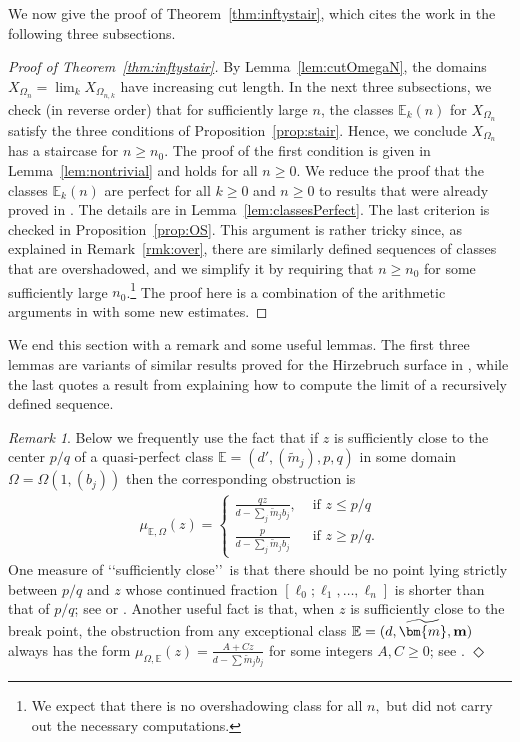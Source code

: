 \documentclass[11pt, reqno]{amsart}
\theoremstyle{remark}
\numberwithin{equation}{subsection}
\numberwithin{figure}{section}
\theoremstyle{customremark}
\newtheorem{rmk_no_diamond}[thm]{Remark}
\newenvironment{rmk}{\begin{rmk_no_diamond} } {\hfill$\er$ \end{rmk_no_diamond}}
\newcommand{\Tm}{{\widetilde m}}
\newcommand{\bE}{{\mathbb E}}
\newcommand{\Om}{{\Omega}}
\newcommand{\er}{{\Diamond}}
\newcommand{\btm}{\widetilde{\bm{m}}}
\begin{document}
We now give the proof of Theorem~\ref{thm:inftystair}, which cites the work in the following three subsections. 
\begin{proof}[Proof of Theorem~\ref{thm:inftystair}]
	By Lemma~\ref{lem:cutOmegaN}, the domains $X_{\Omega_n} = \lim_k X_{\Omega_{n,k}}$ have increasing cut length. In the next three subsections, we check (in reverse order) that for sufficiently large $n$, the classes $\bE_k(n)$ for $X_{\Omega_n}$ satisfy the three conditions of Proposition~\ref{prop:stair}. Hence, we conclude $X_{\Omega_n}$ has a staircase for $n \geq n_0$. The proof of the first condition is given in Lemma~\ref{lem:nontrivial} and holds for all $n \geq 0$. 
	We reduce the proof that the classes $\bE_k(n)$ are perfect for all $k \geq 0$ and $n \geq 0$  to results that were already proved in \cite{BHM}. The details are in  Lemma~\ref{lem:classesPerfect}.  The last criterion is checked in Proposition~\ref{prop:OS}. This argument is rather tricky since, as explained in Remark~\ref{rmk:over}, there are similarly defined sequences of classes that are overshadowed, and we simplify it by requiring
	 that $n \geq n_0$ for some sufficiently large $n_0$.\footnote{We expect that there is no overshadowing class for all $n,$ but did not carry out the necessary computations.} 
	 The proof here is a combination of the arithmetic arguments in \cite[\S4.3]{MM} with some new estimates.
\end{proof} 

We end this section with a remark and some useful lemmas. The first three lemmas are variants of similar results proved for the Hirzebruch surface in \cite{BHM}, while the last quotes a result from \cite{MM} explaining how to compute the limit of a recursively defined sequence.

\begin{rmk} \label{rmk:obstr} Below we frequently use the fact that if $z$ is sufficiently close to the center $p/q$ of a quasi-perfect class $\bE = (d',(\Tm_j), p,q)$ in some domain $\Om=\Om(1,(b_j))$  then the corresponding obstruction  is 
\begin{align}\label{eqn:obstr}
\mu_{\bE, \Om}(z) = \begin{cases} \frac {qz}{d-\sum_j\Tm_j b_j}, & \mbox{ if } z\le p/q\\
\frac p{d-\sum_j\Tm_j b_j} & \mbox{ if } z\ge p/q.\end{cases}
\end{align}
One measure of \lq\lq sufficiently close\rq\rq\  is that there should be no point lying strictly between $p/q$ and $z$ whose continued fraction 
$[\ell_0; \ell_1,\dots,\ell_n]$ is shorter than that of $p/q$; see \cite{ball} or \cite{MMW}. Another useful fact is that,
 when $z$ is sufficiently close to the break point,  the obstruction from any exceptional class $\bE = (d, \btm, \bf{m})$ always has the form $\mu_{\Om, \bE}(z) = \frac{A + Cz}{ d-\sum \Tm_j b_j}$ for some integers $A,C\ge 0$; see \cite[Prop.2.3.2]{ball}.
\end{rmk}
\end{document}
